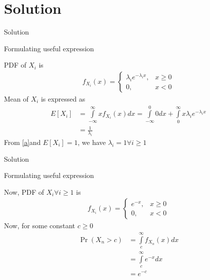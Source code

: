 \documentclass{beamer}
\providecommand{\pr}[1]{\ensuremath{\Pr\left(#1\right)}}
\newcommand{\Integral}[2]{\ensuremath{\int\limits_{#1}^{#2}}}
\providecommand{\pr}[1]{\ensuremath{\Pr\left(#1\right)}}
\theoremstyle{remark}
\providecommand{\mean}[1]{E[ #1 ]}
\numberwithin{equation}{subsection}
\begin{document}
\section{Solution}
\begin{frame}{Solution}
\begin{block}{Formulating useful expression}

PDF of $X_i$ is
\begin{align}
    f_{X_i}(x)=\begin{cases}\lambda_i e^{-\lambda_i x}, &x\geq 0\\
                0, &x<0\nonumber
    \end{cases}    
\end{align} 
Mean of $X_i$ is expressed as
\begin{align}
    \mean{X_i}&=\Integral{-\infty}{\infty}x f_{X_i}(x) dx
              =\Integral{-\infty}{0}0 dx + \Integral{0}{\infty}x \lambda_i e^{-\lambda_i x}\nonumber\\
              &=\frac{1}{\lambda_i}\label{a}
\end{align}
From \eqref{a}and $\mean{X_i}=1$, we have $\lambda_i=1 \forall  i \geq1$

\end{block}
\end{frame}

\begin{frame}{Solution}
\begin{block}{Formulating useful expression}

Now, PDF of $X_i \forall i\geq 1$ is
\begin{align}
    f_{X_i}(x)=\begin{cases}e^{-x}, &x\geq 0\\
                0, &x<0\nonumber
    \end{cases}    
\end{align} 
Now, for some constant $c\geq0$
\begin{align}
    \pr{X_n>c}&=\Integral{c}{\infty}f_{X_n}(x)dx\nonumber\\
              &=\Integral{c}{\infty}e^{-x}dx\nonumber\\
              &=e^{-c}\label{b}
\end{align}
\end{block}
\end{frame}
\end{document}
